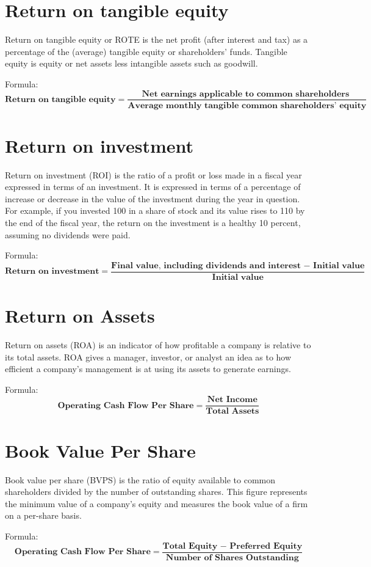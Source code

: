 \documentclass{article}
\begin{document}
\section{Return on tangible equity}
\label{sec:rote}
Return on tangible equity or ROTE is the net profit (after interest and tax) as a percentage of the (average) tangible equity or shareholders' funds. Tangible equity is equity or net assets less intangible assets such as goodwill.
\par
\bigskip
Formula:
$$
\textbf{Return on tangible equity} =  \frac{\textbf{Net earnings applicable to common shareholders }}{\textbf{Average monthly tangible common shareholders' equity}}
$$

\section{Return on investment}
\label{sec:roi}
Return on investment (ROI) is the ratio of a profit or loss made in a fiscal year expressed in terms of an investment. It is expressed in terms of a percentage of increase or decrease in the value of the investment during the year in question. For example, if you invested 100 in a share of stock and its value rises to 110 by the end of the fiscal year, the return on the investment is a healthy 10 percent, assuming no dividends were paid. 
\par
\bigskip
Formula:
$$
\textbf{Return on investment} =  \frac{\textbf{Final value, including dividends and interest − Initial value
}}{\textbf{Initial value}}
$$

\section{Return on Assets}
\label{sec:roa}
Return on assets (ROA) is an indicator of how profitable a company is relative to its total assets. ROA gives a manager, investor, or analyst an idea as to how efficient a company's management is at using its assets to generate earnings.
\par
\bigskip
Formula:
$$
\textbf{Operating Cash Flow Per Share} =  \frac{\textbf{Net Income}}{\textbf{Total Assets}}
$$

\section{Book Value Per Share}
\label{sec:bvps}
Book value per share (BVPS) is the ratio of equity available to common shareholders divided by the number of outstanding shares. This figure represents the minimum value of a company's equity and measures the book value of a firm on a per-share basis. 
\par
\bigskip
Formula:
$$
\textbf{Operating Cash Flow Per Share} =  \frac{\textbf{Total Equity − Preferred Equity
}}{\textbf{Number of Shares Outstanding}}
$$
\end{document}

